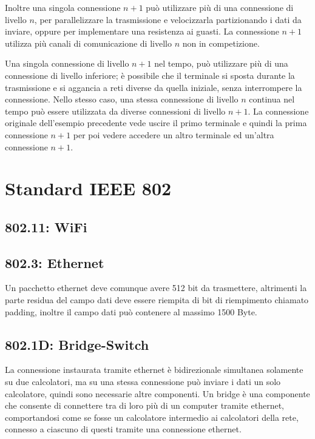 \documentclass{article}
\numberwithin{equation}{subsection}
\begin{document}
Inoltre una singola connessione $n+1$ può utilizzare più di una connessione di livello $n$, per parallelizzare la trasmissione e velocizzarla partizionando i dati da 
inviare, oppure per implementare una resistenza ai guasti. La connessione $n+1$ utilizza più canali di comunicazione di livello $n$ non in competizione. 

Una singola connessione di livello $n+1$ nel tempo, può utilizzare più di una connessione di livello inferiore; è possibile che il terminale si sposta durante la 
trasmissione e si aggancia a reti diverse da quella iniziale, senza interrompere la connessione. 
Nello stesso caso, una stessa connessione di livello $n$ continua nel tempo può essere utilizzata da diverse connessioni di livello $n+1$. La connessione originale dell'esempio 
precedente vede uscire il primo terminale e quindi la prima connessione $n+1$ per poi vedere accedere un altro terminale ed un'altra connessione $n+1$. 

\clearpage

\section{Standard IEEE 802}



\subsection{802.11: WiFi}


\subsection{802.3: Ethernet}


Un pacchetto ethernet deve comunque avere 512 bit da trasmettere, altrimenti la parte residua del campo dati deve essere riempita di bit 
di riempimento chiamato padding, inoltre il campo dati può contenere al massimo 1500 Byte. 

\subsection{802.1D: Bridge-Switch}

La connessione instaurata tramite ethernet è bidirezionale simultanea solamente su due calcolatori, ma su una stessa connessione può inviare i dati un solo 
calcolatore, quindi sono necessarie altre componenti. Un bridge è una componente che consente di connettere tra di loro più di un computer 
tramite ethernet, comportandosi come se fosse un calcolatore intermedio ai calcolatori della rete, connesso a ciascuno di questi tramite una connessione 
ethernet. 
\end{document}

